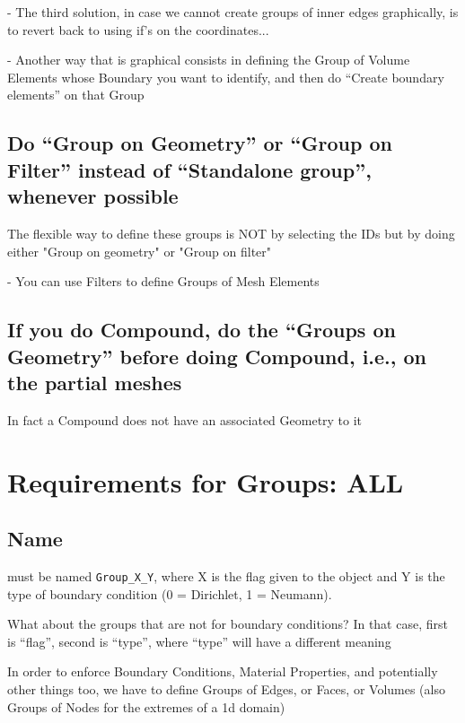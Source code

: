 \documentclass[10pt]{book}
\begin{document}
 - The third solution, in case we cannot create groups of inner edges graphically,
    is to revert back to using if's on the coordinates...  
 
 - Another way that is graphical consists in defining the Group of Volume Elements
 whose Boundary you want to identify,
 and then do ``Create boundary elements'' on that Group
 
 
 \subsection{Do ``Group on Geometry'' or ``Group on Filter'' instead of ``Standalone group'',
          whenever possible}
          
    The flexible way to define these groups is NOT by selecting the IDs but by doing either "Group on geometry" or "Group on filter"

- You can use Filters to define Groups of Mesh Elements

        
  \subsection{If you do Compound, do the ``Groups on Geometry'' before doing Compound, i.e., on the partial meshes}         
          
  In fact a Compound does not have an associated Geometry to it
        
          
\section{Requirements for Groups: ALL}


\subsection{Name}

  must be named \verb|Group_X_Y|, where X is the flag given to the object and Y is the type of boundary condition (0 = Dirichlet, 1 = Neumann).
  
  
  What about the groups that are not for boundary conditions? In that case, first is ``flag'', second is ``type'', where ``type'' will have
  a different meaning

  In order to enforce Boundary Conditions, Material Properties, and potentially other things too,
  we have to define Groups of Edges, or Faces, or Volumes (also Groups of Nodes for the extremes of a 1d domain)
  
\end{document}
